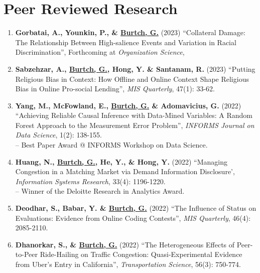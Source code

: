 \documentclass[10.5pt,letterpaper,sans]{moderncv}        %
\renewcommand*{\bibliographyitemlabel}{[\arabic{enumiv}]} %
\renewcommand*{\bibliographyitemlabel}{\arabic{enumiv}.} %
\begin{document}

\vspace{8 pt}

\section{Peer Reviewed Research}

\smallskip

\begin{enumerate}[leftmargin=!,labelindent=5pt,itemindent=-15pt]

\item \textbf{Gorbatai, A., Younkin, P., \& \underline{Burtch, G.}} (2023) ``Collateral Damage: The Relationship Between High-salience Events and Variation in Racial Discrimination'', Forthcoming at \textit{Organization Science}, 

\item \textbf{Sabzehzar, A., \underline{Burtch, G.}, Hong, Y. \& Santanam, R.} (2023) ``Putting Religious Bias in Context: How Offline and Online Context Shape Religious Bias in Online Pro-social Lending'', \textit{MIS Quarterly}, 47(1): 33-62.

\item \textbf{Yang, M., McFowland, E., \underline{Burtch, G.} \& Adomavicius, G.} (2022) ``Achieving Reliable Causal Inference with Data-Mined Variables: A Random Forest Approach to the Measurement Error Problem'', \textit{INFORMS Journal on Data Science}, 1(2): 138-155.  \\-- Best Paper Award @ INFORMS Workshop on Data Science.

\item \textbf{Huang, N., \underline{Burtch, G.}, He, Y., \& Hong, Y.} (2022) ``Managing Congestion in a Matching Market via Demand Information Disclosure', \textit{Information Systems Research}, 33(4): 1196-1220. \\-- Winner of the Deloitte Research in Analytics Award.

\item \textbf{Deodhar, S., Babar, Y. \& \underline{Burtch, G.}} (2022) ``The Influence of Status on Evaluations: Evidence from Online Coding Contests'', \textit{MIS Quarterly}, 46(4): 2085-2110.

\item \textbf{Dhanorkar, S., \& \underline{Burtch, G.}} (2022) ``The Heterogeneous Effects of Peer-to-Peer Ride-Hailing on Traffic Congestion: Quasi-Experimental Evidence from Uber's Entry in California'', \textit{Transportation Science}, 56(3): 750-774.


\end{enumerate}
\end{document}
